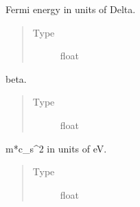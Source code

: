 \documentclass[letterpaper,10pt,english]{sphinxmanual}
\begin{document}
\begin{fulllineitems}
\begin{fulllineitems}
\end{fulllineitems}


\begin{fulllineitems}
\label{\detokenize{code_structure:scdc.material.Material.z}}
Fermi energy in units of Delta.
\begin{quote}\begin{description}
\item[{Type}] \leavevmode
float

\end{description}\end{quote}

\end{fulllineitems}


\begin{fulllineitems}
\label{\detokenize{code_structure:scdc.material.Material.beta}}
beta.
\begin{quote}\begin{description}
\item[{Type}] \leavevmode
float

\end{description}\end{quote}

\end{fulllineitems}


\begin{fulllineitems}
\label{\detokenize{code_structure:scdc.material.Material.mcs2}}
m*c\_s\textasciicircum{}2 in units of eV.
\begin{quote}\begin{description}
\item[{Type}] \leavevmode
float

\end{description}\end{quote}

\end{fulllineitems}


\end{fulllineitems}
\end{document}

